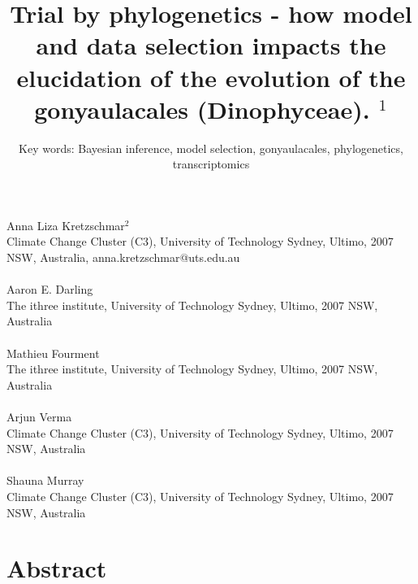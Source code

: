 \documentclass[12pt]{article}
\title{Trial by phylogenetics - how model and data selection impacts the elucidation of the evolution of the gonyaulacales (Dinophyceae). $^{1}$}
\author{Key words: Bayesian inference, model selection, gonyaulacales, phylogenetics, transcriptomics}
\date{}
\begin{document}
\maketitle

\paragraph{}Anna Liza Kretzschmar$^{2}$\\
Climate Change Cluster (C3), University of Technology Sydney, Ultimo, 2007 NSW, Australia, anna.kretzschmar@uts.edu.au
\paragraph{}Aaron E. Darling \\
The ithree institute, University of Technology Sydney, Ultimo, 2007 NSW, Australia
\paragraph{}Mathieu Fourment \\
The ithree institute, University of Technology Sydney, Ultimo, 2007 NSW, Australia
\paragraph{}Arjun Verma\\
Climate Change Cluster (C3), University of Technology Sydney, Ultimo, 2007 NSW, Australia
\paragraph{}Shauna Murray\\ 
Climate Change Cluster (C3), University of Technology Sydney, Ultimo, 2007 NSW, Australia
\newpage
\section{Abstract}
\newpage
\end{document}
